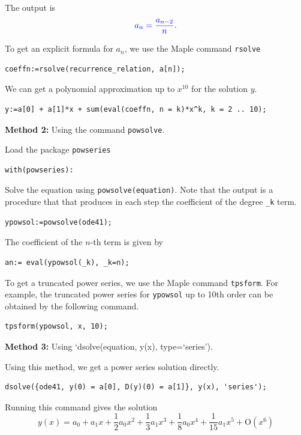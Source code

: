 \documentclass[
  12pt]{elegantbook}
\begin{document}
\begin{solution}
The output is
\[\color{blue}{a_{n} = \frac{a_{n -2}}{n}}.\]

To get an explicit formula for \(a_n\), we use the Maple command \texttt{rsolve}

\begin{verbatim}
coeffn:=rsolve(recurrence_relation, a[n]);
\end{verbatim}

We can get a polynomial approximation up to \(x^{10}\) for the solution \(y\).

\begin{verbatim}
y:=a[0] + a[1]*x + sum(eval(coeffn, n = k)*x^k, k = 2 .. 10);
\end{verbatim}

\textbf{Method 2:} Using the command \texttt{powsolve}.

Load the package \texttt{powseries}

\begin{verbatim}
with(powseries):
\end{verbatim}

Solve the equation using \texttt{powsolve(equation)}. Note that the output is a procedure that that produces in each step the coefficient of the degree \texttt{\_k} term.

\begin{verbatim}
ypowsol:=powsolve(ode41);
\end{verbatim}

The coefficient of the \(n\)-th term is given by

\begin{verbatim}
an:= eval(ypowsol(_k), _k=n);
\end{verbatim}

To get a truncated power series, we use the Maple command \texttt{tpsform}. For example, the truncated power series for \texttt{ypowsol} up to 10th order can be obtained by the following command.

\begin{verbatim}
tpsform(ypowsol, x, 10);
\end{verbatim}

\textbf{Method 3:} Using `dsolve(equation, y(x), type=`series').

Using this method, we get a power series solution directly.

\begin{verbatim}
dsolve({ode41, y(0) = a[0], D(y)(0) = a[1]}, y(x), 'series');
\end{verbatim}

Running this command gives the solution
\[y\left(x \right) = a_{0}+a_{1} x +\frac{1}{2} a_{0} x^{2}+\frac{1}{3} a_{1} x^{3}+\frac{1}{8} a_{0} x^{4}+\frac{1}{15} a_{1} x^{5}+\mathrm{O}\left(x^{6}\right)\]
\end{solution}
\end{document}
